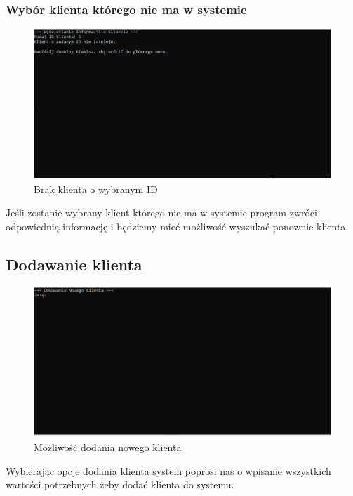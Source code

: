 \subsubsection{Wybór klienta którego nie ma w systemie}
\begin{figure}[h]
    \centering
    \includegraphics[width=\textwidth]{WysInfBrak.png}
      \caption{Brak klienta o wybranym ID}
    \label{fig:example}
\end{figure}

Jeśli zostanie wybrany klient którego nie ma w systemie program zwróci odpowiednią informację i będziemy mieć możliwość wyszukać ponownie klienta. 

\newpage

\subsection{Dodawanie klienta}


\begin{figure}[h]
    \centering
    \includegraphics[width=\textwidth]{DodawanieKlienta.png}
      \caption{Możliwość dodania nowego klienta}
    \label{fig:example}
\end{figure}

Wybierając opcje dodania klienta system poprosi nas o wpisanie wszystkich wartości potrzebnych żeby dodać klienta do systemu. 


